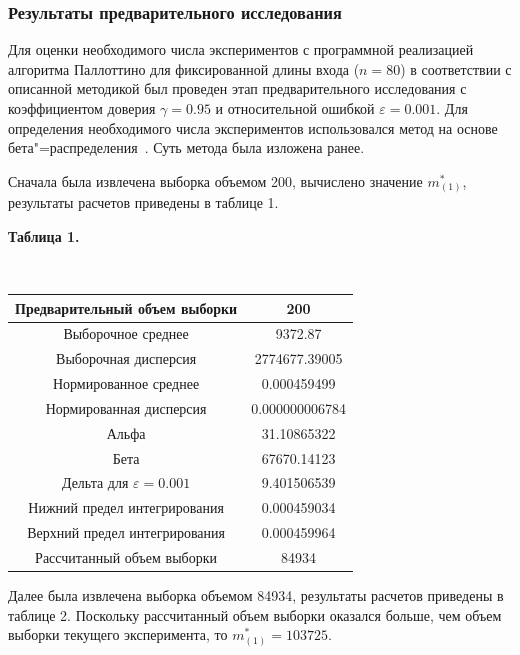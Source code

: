 \documentclass[a4paper, article, 14pt]{extarticle}
\begin{document}
\subsubsection{Результаты предварительного исследования}\label{subsec:results_part_1}

Для оценки необходимого числа экспериментов с программной реализацией алгоритма Паллоттино для фиксированной длины входа ($n = 80$) в соответствии с описанной методикой был проведен этап предварительного исследования с коэффициентом доверия $\gamma = 0.95$ и относительной ошибкой $\varepsilon = 0.001$. Для определения необходимого числа экспериментов использовался метод на основе бета"=распределения~\cite{petrushyn_ulyanov_planning}. Суть метода была изложена ранее.

Сначала была извлечена выборка объемом 200, вычислено значение $m_{(1)}^*$, результаты расчетов приведены в таблице 1.

\newpage

\begin{center}\label{table1}
	\begin{small}
		\textbf{Таблица 1.}
	\end{small}\\
	\hfill \break
	\begin{tabular}{|c|c|}
		\hline
		Предварительный объем выборки & 200\\
		\hline
		Выборочное среднее & 9372.87\\
		\hline
		Выборочная дисперсия & 2774677.39005\\
		\hline
		Нормированное среднее & 0.000459499\\
		\hline
		Нормированная дисперсия & 0.000000006784\\
		\hline
		Альфа & 31.10865322\\
		\hline
		Бета & 67670.14123\\
		\hline
		Дельта для $\varepsilon = 0.001$ & 9.401506539\\
		\hline
		Нижний предел интегрирования & 0.000459034\\
		\hline
		Верхний предел интегрирования & 0.000459964\\
		\hline
		Рассчитанный объем выборки & 84934\\
		\hline
	\end{tabular}
\end{center}

Далее была извлечена выборка объемом 84934, результаты расчетов приведены в таблице 2. Поскольку рассчитанный объем выборки оказался больше, чем объем выборки текущего эксперимента, то $m_{(1)}^* = 103725$.
\end{document}
